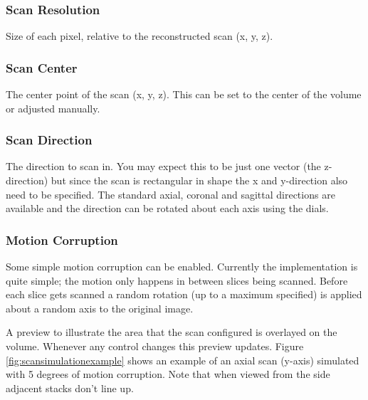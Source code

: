 \subsubsection*{Scan Resolution}
Size of each pixel, relative to the reconstructed scan (x, y, z).

\subsubsection*{Scan Center}
The center point of the scan (x, y, z). This can be set to the center of the volume or adjusted manually.

\subsubsection*{Scan Direction}
The direction to scan in. You may expect this to be just one vector (the z-direction) but since the scan is rectangular in shape the x and y-direction also need to be specified. The standard axial, coronal and sagittal directions are available and the direction can be rotated about each axis using the dials.

\subsubsection*{Motion Corruption}
Some simple motion corruption can be enabled. Currently the implementation is quite simple; the motion only happens in between slices being scanned. Before each slice gets scanned a random rotation (up to a maximum specified) is applied about a random axis to the original image.

A preview to illustrate the area that the scan configured is overlayed on the volume. Whenever any control changes this preview updates. Figure \ref{fig:scansimulationexample} shows an example of an axial scan (y-axis) simulated with 5 degrees of motion corruption. Note that when viewed from the side adjacent stacks don't line up.


